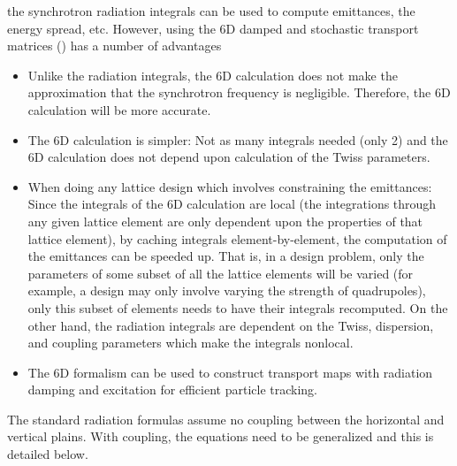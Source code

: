 the synchrotron radiation integrals can be used to compute emittances, the energy spread,
etc. However, using the 6D damped and stochastic transport matrices () has
a number of advantages
\begin{itemize}
%
\item
Unlike the radiation integrals, the 6D calculation does not make the approximation that the
synchrotron frequency is negligible. Therefore, the 6D calculation will be more accurate.
%
\item
The 6D calculation is simpler: Not as many integrals needed (only 2) and the 6D calculation does not
depend upon calculation of the Twiss parameters.
%
\item
When doing any lattice design which involves constraining the emittances: Since the integrals of the
6D calculation are local (the integrations through any given lattice element are only dependent upon
the properties of that lattice element), by caching integrals element-by-element, the computation of
the emittances can be speeded up. That is, in a design problem, only the parameters of some subset
of all the lattice elements will be varied (for example, a design may only involve varying the
strength of quadrupoles), only this subset of elements needs to have their integrals recomputed.  On
the other hand, the radiation integrals are dependent on the Twiss, dispersion, and coupling
parameters which make the integrals nonlocal.
%
\item
The 6D formalism can be used to construct transport maps with radiation damping and excitation for
efficient particle tracking.
\end{itemize}

The standard radiation formulas assume no coupling between the horizontal and vertical
plains\cite{b:helm,b:jowett}. With coupling, the equations need to be generalized and this is
detailed below.

